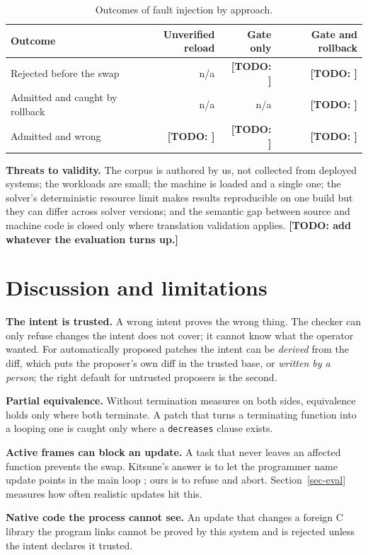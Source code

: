 \documentclass[10pt,twocolumn]{article}
\newcommand{\todo}[1]{{\color{red}\textbf{[TODO: #1]}}}
\begin{document}
\begin{table}[t]\centering\small
\begin{tabular}{lrrr}\toprule
Outcome & Unverified reload & Gate only & Gate and rollback \\
\midrule
Rejected before the swap & n/a & \todo{} & \todo{} \\
Admitted and caught by rollback & n/a & n/a & \todo{} \\
Admitted and wrong & \todo{} & \todo{} & \todo{} \\
\bottomrule
\end{tabular}
\caption{Outcomes of fault injection by approach.}\label{tab-faults}
\end{table}
\textbf{Threats to validity.} The corpus is authored by us, not collected from deployed systems; the workloads are small; the machine is loaded and a single one; the solver's deterministic resource limit makes results reproducible on one build but they can differ across solver versions; and the semantic gap between source and machine code is closed only where translation validation applies. \todo{add whatever the evaluation turns up.}

\section{Discussion and limitations}\label{sec-disc}
\textbf{The intent is trusted.} A wrong intent proves the wrong thing. The checker can only refuse changes the intent does not cover; it cannot know what the operator wanted. For automatically proposed patches the intent can be \emph{derived} from the diff, which puts the proposer's own diff in the trusted base, or \emph{written by a person}; the right default for untrusted proposers is the second.

\textbf{Partial equivalence.} Without termination measures on both sides, equivalence holds only where both terminate. A patch that turns a terminating function into a looping one is caught only where a \texttt{decreases} clause exists.

\textbf{Active frames can block an update.} A task that never leaves an affected function prevents the swap. Kitsune's answer is to let the programmer name update points in the main loop \cite{hayden2012kitsune}; ours is to refuse and abort. Section~\ref{sec-eval} measures how often realistic updates hit this.

\textbf{Native code the process cannot see.} An update that changes a foreign C library the program links cannot be proved by this system and is rejected unless the intent declares it trusted.
\end{document}

